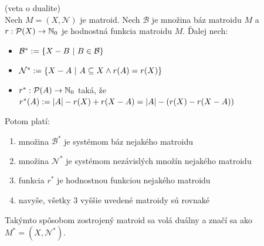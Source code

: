 \begin{theorem}{(veta o dualite)}\\
Nech $M = (X, \mathcal{N})$ je matroid. Nech $\mathcal{B}$ je množina báz matroidu $M$ a $r:\mathcal{P}(X) \to \mathbb{N}_0$ je hodnostná funkcia matroidu $M$.
Ďalej nech:
\begin{itemize}
    \item $\mathcal{B}^* := \left\{X - B ~|~ B \in \mathcal{B}\right\}$
    \item $\mathcal{N}^* := \left\{X - A ~|~ A \subseteq X \wedge r(A) = r(X)\right\}$
    \item $r^*: \mathcal{P}(A) \to \mathbb{N}_0$ taká, že $r^*(A) := \left|A\right| - r(X) + r(X - A) = \left|A\right| - (r(X) - r(X-A))$
\end{itemize}

\noindent
Potom platí:
\begin{enumerate}
    \item množina $\mathcal{B}^*$ je systémom báz nejakého matroidu
    \item množina $\mathcal{N}^*$ je systémom nezávislých množín nejakého matroidu
    \item funkcia $r^*$ je hodnostnou funkciou nejakého matroidu
    \item navyše, všetky 3 vyššie uvedené matroidy sú rovnaké
\end{enumerate}
\noindent
Takýmto spôsobom zostrojený matroid sa volá duálny a značí sa ako $M^* = (X, \mathcal{N}^*)$.
\end{theorem}
